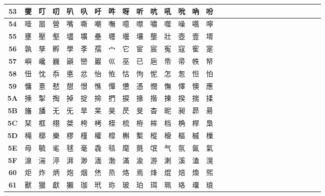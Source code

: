 \begin{table}[H]
\begin{tabular}{|Sc|Sc|Sc|Sc|Sc|Sc|Sc|Sc|Sc|Sc|Sc|Sc|Sc|Sc|Sc|}
\textbf{53} & 燮 & 叮 & 叨 & 叭 & 叺 & 吁 & 吽 & 呀 & 听 & 吭 & 吼 & 吮 & 吶 & 吩 \\ \hline
\textbf{54} & 噎 & 噐 & 營 & 嘴 & 嘶 & 嘲 & 嘸 & 噫 & 噤 & 嘯 & 噬 & 噪 & 嚆 & 嚀 \\ \hline
\textbf{55} & 壅 & 壓 & 壑 & 壗 & 壙 & 壘 & 壥 & 壜 & 壤 & 壟 & 壯 & 壺 & 壹 & 壻 \\ \hline
\textbf{56} & 孰 & 孳 & 孵 & 學 & 斈 & 孺 & 宀 & 它 & 宦 & 宸 & 寃 & 寇 & 寉 & 寔 \\ \hline
\textbf{57} & 嶼 & 巉 & 巍 & 巓 & 巒 & 巖 & 巛 & 巫 & 已 & 巵 & 帋 & 帚 & 帙 & 帑 \\ \hline
\textbf{58} & 忸 & 忱 & 忝 & 悳 & 忿 & 怡 & 恠 & 怙 & 怐 & 怩 & 怎 & 怱 & 怛 & 怕 \\ \hline
\textbf{59} & 慵 & 憙 & 憖 & 憇 & 憬 & 憔 & 憚 & 憊 & 憑 & 憫 & 憮 & 懌 & 懊 & 應 \\ \hline
\textbf{5A} & 捶 & 掣 & 掏 & 掉 & 掟 & 掵 & 捫 & 捩 & 掾 & 揩 & 揀 & 揆 & 揣 & 揉 \\ \hline
\textbf{5B} & 旛 & 旙 & 无 & 旡 & 旱 & 杲 & 昊 & 昃 & 旻 & 杳 & 昵 & 昶 & 昴 & 昜 \\ \hline
\textbf{5C} & 栞 & 框 & 栩 & 桀 & 桍 & 栲 & 桎 & 梳 & 栫 & 桙 & 档 & 桷 & 桿 & 梟 \\ \hline
\textbf{5D} & 槞 & 槨 & 樂 & 樛 & 槿 & 權 & 槹 & 槲 & 槧 & 樅 & 榱 & 樞 & 槭 & 樔 \\ \hline
\textbf{5E} & 毋 & 毓 & 毟 & 毬 & 毫 & 毳 & 毯 & 麾 & 氈 & 氓 & 气 & 氛 & 氤 & 氣 \\ \hline
\textbf{5F} & 湶 & 湍 & 渟 & 湃 & 渺 & 湎 & 渤 & 滿 & 渝 & 游 & 溂 & 溪 & 溘 & 滉 \\ \hline
\textbf{60} & 炬 & 炸 & 炳 & 炮 & 烟 & 烋 & 烝 & 烙 & 焉 & 烽 & 焜 & 焙 & 煥 & 煕 \\ \hline
\textbf{61} & 獸 & 獵 & 獻 & 獺 & 珈 & 玳 & 珎 & 玻 & 珀 & 珥 & 珮 & 珞 & 璢 & 琅 \\ \hline
\end{tabular}
\end{table}

